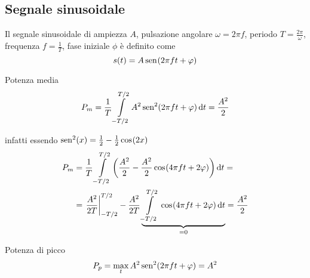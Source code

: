 \begin{enumerate}
\end{enumerate}

\subsection{Segnale sinusoidale}
Il segnale sinusoidale di ampiezza $A$, pulsazione angolare $\omega=2\pi f$, periodo $T=\frac{2\pi}{\omega}$, frequenza $f=\frac{1}{T}$, fase iniziale $\phi$ è definito come
\begin{equation}
s(t)=A\,{\operatorname{sen}}^{}\!\left({2\pi f t+\varphi}\right)
\end{equation}

Potenza media
\begin{equation}
P_m=\frac{1}{T}\int\limits_{-T/2}^{T/2}{A^2\operatorname{sen}^2(2\pi f t+\varphi)}{\,\mathop{}\!\mathrm{d}{t}}= \frac{A^2}{2}
\end{equation}

infatti essendo $\operatorname{sen}^2(x)=\frac{1}{2}-\frac{1}{2}\,{\operatorname{cos}}^{}\!\left({2x}\right)$
\[\begin{split}P_m&=\frac{1}{T}\int\limits_{-T/2}^{T/2}{\left(\frac{A^2}{2}-\frac{A^2}{2}\,{\operatorname{cos}}^{}\!\left({4\pi f t+2\varphi}\right)\right)}{\,\mathop{}\!\mathrm{d}{t}}=\\
&=\left.{\frac{A^2}{2 T}}\right\rvert_{-T/2}^{T/2}-\frac{A^2}{2 T}\underbrace{\int\limits_{-T/2}^{T/2}{\,{\operatorname{cos}}^{}\!\left({4\pi f t+2\varphi}\right)}{\,\mathop{}\!\mathrm{d}{t}}}_{=0}=\frac{A^2}{2}\end{split}\]

Potenza di picco
\begin{equation}
P_p=\max\limits_{t} A^2\operatorname{sen}^2(2\pi f t+\varphi)=A^2
\end{equation}

